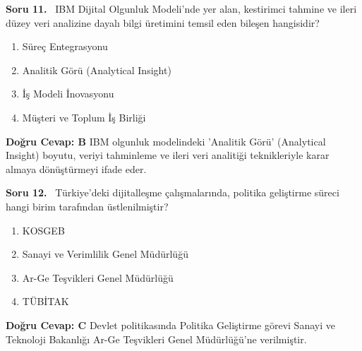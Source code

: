 \documentclass[11pt,a4paper,openany]{book}
\begin{document}
\needspace{5cm}
\vspace{8pt}
\noindent\textbf{\large\sffamily Soru 11.} \ IBM Dijital Olgunluk Modeli'nde yer alan, kestirimci tahmine ve ileri düzey veri analizine dayalı bilgi üretimini temsil eden bileşen hangisidir?
\begin{enumerate}[label=\Alph*), leftmargin=25pt, topsep=4pt, itemsep=2pt]
    \item Süreç Entegrasyonu
    \item Analitik Görü (Analytical Insight)
    \item İş Modeli İnovasyonu
    \item Müşteri ve Toplum İş Birliği
\end{enumerate}
\vspace{4pt}
\begin{tcolorbox}[title=Cevap ve Açıklama, colback=gray!3!white, colframe=primarycolor!90!black, arc=2mm, fonttitle=\bfseries\sffamily, top=6pt, bottom=6pt]
    \textbf{Doğru Cevap: B}
    \vspace{2pt}
    IBM olgunluk modelindeki 'Analitik Görü' (Analytical Insight) boyutu, veriyi tahminleme ve ileri veri analitiği teknikleriyle karar almaya dönüştürmeyi ifade eder.
\end{tcolorbox}
\vspace{10pt}

\needspace{5cm}
\vspace{8pt}
\noindent\textbf{\large\sffamily Soru 12.} \ Türkiye'deki dijitalleşme çalışmalarında, politika geliştirme süreci hangi birim tarafından üstlenilmiştir?
\begin{enumerate}[label=\Alph*), leftmargin=25pt, topsep=4pt, itemsep=2pt]
    \item KOSGEB
    \item Sanayi ve Verimlilik Genel Müdürlüğü
    \item Ar-Ge Teşvikleri Genel Müdürlüğü
    \item TÜBİTAK
\end{enumerate}
\vspace{4pt}
\begin{tcolorbox}[title=Cevap ve Açıklama, colback=gray!3!white, colframe=primarycolor!90!black, arc=2mm, fonttitle=\bfseries\sffamily, top=6pt, bottom=6pt]
    \textbf{Doğru Cevap: C}
    \vspace{2pt}
    Devlet politikasında Politika Geliştirme görevi Sanayi ve Teknoloji Bakanlığı Ar-Ge Teşvikleri Genel Müdürlüğü'ne verilmiştir.
\end{tcolorbox}
\vspace{10pt}
\end{document}
